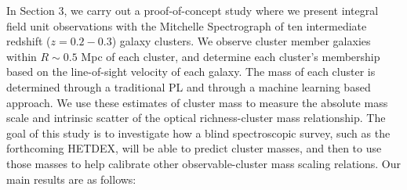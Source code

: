 In Section 3, we carry out a proof-of-concept study where we present integral field unit observations with the Mitchelle Spectrograph of ten intermediate redshift ($z=0.2-0.3$) galaxy clusters. We observe cluster member galaxies within $R\sim0.5$ Mpc of each cluster, and determine each cluster's membership based on the line-of-sight velocity of each galaxy. The mass of each cluster is determined through a traditional PL and through a machine learning based approach. We use these estimates of cluster mass to measure the absolute mass scale and intrinsic scatter of the optical richness-cluster mass relationship. The goal of this study is to investigate how a blind spectroscopic survey, such as the forthcoming HETDEX, will be able to predict cluster masses, and then to use those masses to help calibrate other observable-cluster mass scaling relations.
Our main results are as follows:
